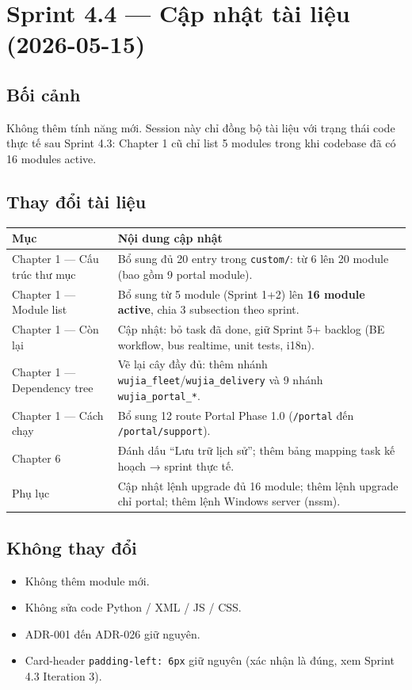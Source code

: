 \chapter{Sprint 4.4 --- Cập nhật tài liệu (2026-05-15)}

\section{Bối cảnh}

Không thêm tính năng mới. Session này chỉ đồng bộ tài liệu với trạng thái code thực tế sau Sprint 4.3: Chapter 1 cũ chỉ list 5 modules trong khi codebase đã có 16 modules active.

\section{Thay đổi tài liệu}

\begin{longtable}{p{4cm} p{10cm}}
\toprule
\textbf{Mục} & \textbf{Nội dung cập nhật} \\
\midrule
\endhead
Chapter 1 --- Cấu trúc thư mục & Bổ sung đủ 20 entry trong \texttt{custom/}: từ 6 lên 20 module (bao gồm 9 portal module). \\
Chapter 1 --- Module list & Bổ sung từ 5 module (Sprint 1+2) lên \textbf{16 module active}, chia 3 subsection theo sprint. \\
Chapter 1 --- Còn lại & Cập nhật: bỏ task đã done, giữ Sprint 5+ backlog (BE workflow, bus realtime, unit tests, i18n). \\
Chapter 1 --- Dependency tree & Vẽ lại cây đầy đủ: thêm nhánh \texttt{wujia\_fleet}/\texttt{wujia\_delivery} và 9 nhánh \texttt{wujia\_portal\_*}. \\
Chapter 1 --- Cách chạy & Bổ sung 12 route Portal Phase 1.0 (\texttt{/portal} đến \texttt{/portal/support}). \\
Chapter 6 & Đánh dấu ``Lưu trữ lịch sử''; thêm bảng mapping task kế hoạch → sprint thực tế. \\
Phụ lục & Cập nhật lệnh upgrade đủ 16 module; thêm lệnh upgrade chỉ portal; thêm lệnh Windows server (nssm). \\
\bottomrule
\end{longtable}

\section{Không thay đổi}

\begin{itemize}
    \item Không thêm module mới.
    \item Không sửa code Python / XML / JS / CSS.
    \item ADR-001 đến ADR-026 giữ nguyên.
    \item Card-header \texttt{padding-left: 6px} giữ nguyên (xác nhận là đúng, xem Sprint 4.3 Iteration 3).
\end{itemize}

